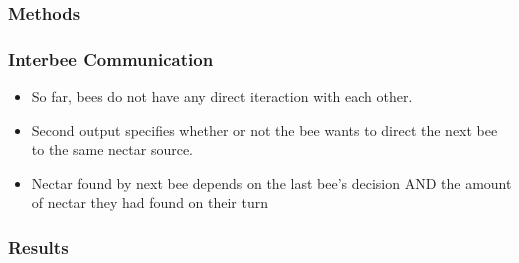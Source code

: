 \documentclass{beamer}
\begin{document}
      \subsubsection{Methods} %
      \label{ssub:methods}
        \begin{frame}[c]\frametitle{Interbee Communication}
         
          \begin{itemize}
            \item So far, bees do not have any direct iteraction with each 
                  other.
            \item Second output specifies whether or not the bee wants to
                  direct the next bee to the same nectar source.
            \item Nectar found by next bee depends on the last bee's decision
                  AND the amount of nectar they had found on their turn
          \end{itemize}
        \end{frame}  

      \subsubsection{Results} %
      \label{ssub:results}
\end{document}

